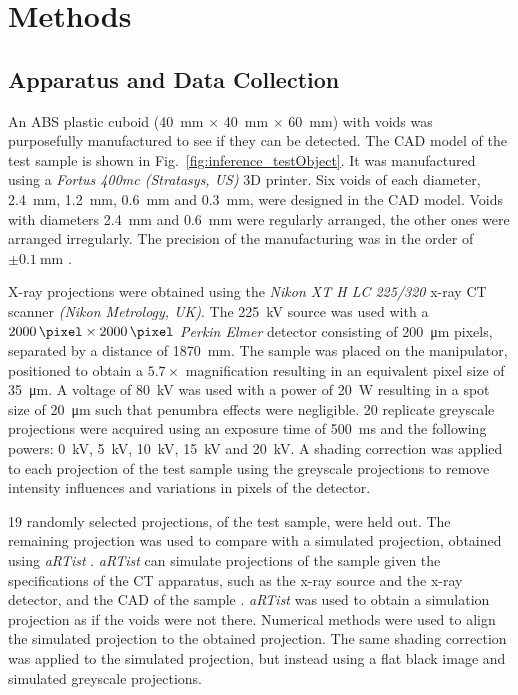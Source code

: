 \documentclass{article}
\begin{document}
\section{Methods}

\subsection{Apparatus and Data Collection}
\label{subsection:appratus}

An ABS plastic cuboid (\SI{40}{\milli\metre} $\times$ \SI{40}{\milli\metre} $\times$ \SI{60}{\milli\metre}) with voids was purposefully manufactured to see if they can be detected. The CAD model of the test sample is shown in Fig.~\ref{fig:inference_testObject}. It was manufactured using a \emph{Fortus 400mc (Stratasys, US)} 3D printer. Six voids of each diameter, \SI{2.4}{\milli\metre}, \SI{1.2}{\milli\metre}, \SI{0.6}{\milli\metre} and \SI{0.3}{\milli\metre}, were designed in the CAD model. Voids with diameters \SI{2.4}{\milli\metre} and \SI{0.6}{\milli\metre} were regularly arranged, the other ones were arranged irregularly. The precision of the manufacturing was in the order of $\pm\SI{0.1}{\milli\metre}$ \citep{hanseen2013fortus}.

X-ray projections were obtained using the \emph{Nikon XT H LC 225/320} x-ray CT scanner \emph{(Nikon Metrology, UK)}. The \SI{225}{\kilo\volt} source was used with a $\SI{2000}{\pixel}\times\SI{2000}{\pixel}$ \emph{Perkin Elmer} detector consisting of \SI{200}{\micro\metre} pixels, separated by a distance of \SI{1870}{\milli\metre}. The sample was placed on the manipulator, positioned to obtain a $5.7\times$ magnification resulting in an equivalent pixel size of \SI{35}{\micro\metre}. A voltage of \SI{80}{\kilo\volt} was used with a power of \SI{20}{\watt} resulting in a spot size of \SI{20}{\micro\metre} such that penumbra effects \citep{kueh2016modelling} were negligible. 20 replicate greyscale projections were acquired using an exposure time of \SI{500}{\milli\second} and the following powers: \SI{0}{\kilo\volt}, \SI{5}{\kilo\volt}, \SI{10}{\kilo\volt}, \SI{15}{\kilo\volt} and \SI{20}{\kilo\volt}. A shading correction \citep{seibert1998flat} was applied to each projection of the test sample using the greyscale projections to remove intensity influences and variations in pixels of the detector.

19 randomly selected projections, of the test sample, were held out. The remaining projection was used to compare with a simulated projection, obtained using \emph{aRTist} \citep{bellon2012radiographic, bellon2007artist, jaenisch2008artist}. \emph{aRTist} can simulate projections of the sample given the specifications of the CT apparatus, such as the x-ray source and the x-ray detector, and the
CAD of the sample \citep{bellon2011simulation, deresch2012simulating}. \emph{aRTist} was used to obtain a simulation projection as if the voids were not there. Numerical methods were used to align the simulated projection to the obtained projection. The same shading correction was applied to the simulated projection, but instead using a flat black image and simulated greyscale projections.
\end{document}
